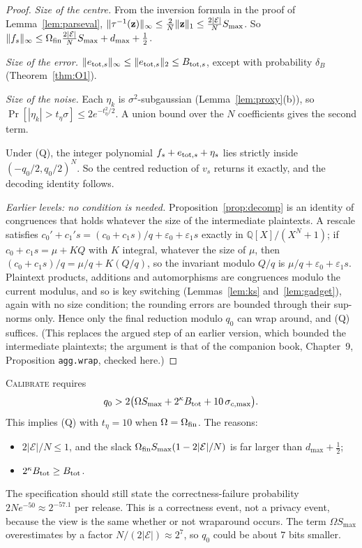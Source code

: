 \begin{proof}
\emph{Size of the centre.} From the inversion formula in the proof of Lemma~\ref{lem:parseval}, $\lVert \tau^{-1}(\mathbf z)\rVert_\infty\le\frac2N\lVert \mathbf z\rVert_1\le\frac{2|\mathcal E|}{N}S_{\max}$. So $\lVert f_s\rVert_\infty\le\Omega_{\mathrm{fin}}\frac{2|\mathcal E|}NS_{\max}+d_{\max}+\frac12$.

\emph{Size of the error.} $\lVert e_{\mathrm{tot},s}\rVert_\infty\le\lVert e_{\mathrm{tot},s}\rVert_2\le B_{\mathrm{tot},s}$, except with probability $\delta_B$ (Theorem~\ref{thm:O1}).

\emph{Size of the noise.} Each $\eta_k$ is $\sigma^2$-subgaussian (Lemma~\ref{lem:proxy}(b)), so $\Pr[|\eta_k|>t_\eta\sigma]\le2e^{-t_\eta^2/2}$. A union bound over the $N$ coefficients gives the second term.

Under (Q), the integer polynomial $f_s+e_{\mathrm{tot},s}+\eta_s$ lies strictly inside $(-q_0/2,q_0/2)^N$. So the centred reduction of $v_s$ returns it exactly, and the decoding identity follows.

\emph{Earlier levels: no condition is needed.} Proposition~\ref{prop:decomp} is an identity of congruences that holds whatever the size of the intermediate plaintexts. A rescale satisfies $c_0'+c_1's=(c_0+c_1s)/q+\varepsilon_0+\varepsilon_1s$ exactly in $\mathbb Q[X]/(X^N+1)$; if $c_0+c_1s=\mu+KQ$ with $K$ integral, whatever the size of $\mu$, then $(c_0+c_1s)/q=\mu/q+K(Q/q)$, so the invariant modulo $Q/q$ is $\mu/q+\varepsilon_0+\varepsilon_1s$. Plaintext products, additions and automorphisms are congruences modulo the current modulus, and so is key switching (Lemmas~\ref{lem:ks} and~\ref{lem:gadget}), again with no size condition; the rounding errors are bounded through their sup-norms only. Hence only the final reduction modulo $q_0$ can wrap around, and (Q) suffices. (This replaces the argued step of an earlier version, which bounded the intermediate plaintexts; the argument is that of the companion book, Chapter~9, Proposition \texttt{agg.wrap}, checked here.)
\end{proof}

\begin{remark}
\textsc{Calibrate} requires
\[
  q_0>2\bigl(\Omega S_{\max}+2^{\kappa}B_{\mathrm{tot}}+10\,\sigma_{c,\max}\bigr).
\]
This implies (Q) with $t_\eta=10$ when $\Omega=\Omega_{\mathrm{fin}}$. The reasons:
\begin{itemize}[nosep]
  \item $2|\mathcal E|/N\le1$, and the slack $\Omega_{\mathrm{fin}} S_{\max}(1-2|\mathcal E|/N)$ is far larger than $d_{\max}+\frac12$;
  \item $2^\kappa B_{\mathrm{tot}}\ge B_{\mathrm{tot}}$.
\end{itemize}
The specification should still state the correctness-failure probability $2Ne^{-50}\approx2^{-57.1}$ per release. This is a correctness event, not a privacy event, because the view is the same whether or not wraparound occurs. The term $\Omega S_{\max}$ overestimates by a factor $N/(2|\mathcal E|)\approx2^{7}$, so $q_0$ could be about $7$ bits smaller.
\end{remark}

